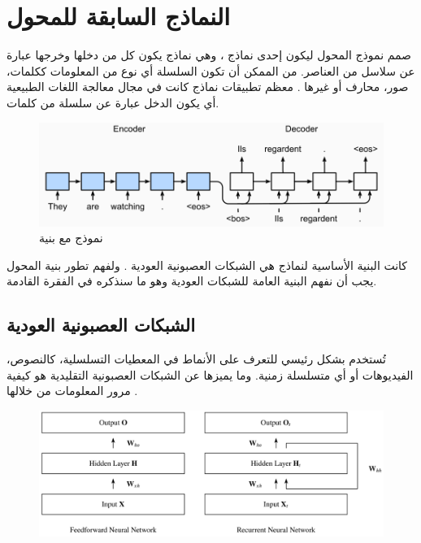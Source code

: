 \section{النماذج السابقة للمحول}
صمم نموذج المحول
ليكون إحدى نماذج
،
وهي نماذج يكون كل من دخلها وخرجها عبارة عن سلاسل من العناصر. من الممكن أن تكون السلسلة أي نوع من المعلومات ككلمات، صور، محارف أو غيرها
.
\newline
معظم تطبيقات نماذج
 كانت في مجال معالجة اللغات الطبيعية
 أي يكون الدخل عبارة عن سلسلة من كلمات.
\begin{figure}[h!]
\centerline{
	\includegraphics[width=\textwidth]{images/RNN.png}}
\caption{نموذج
مع بنية
}
\label{fig:RNN1}	
\end{figure}
كانت البنية الأساسية لنماذج
هي الشبكات العصبونية العودية
.
ولفهم تطور بنية المحول يجب أن نفهم البنية العامة للشبكات العودية وهو ما سنذكره في الفقرة القادمة.
\newline
\subsection{الشبكات العصبونية العودية
}
تُستخدم
 بشكل رئيسي للتعرف على الأنماط في المعطيات التسلسلية، كالنصوص، الفيديوهات أو أي متسلسلة زمنية. وما يميزها
 عن الشبكات العصبونية التقليدية
 هو كيفية مرور المعلومات من خلالها
.

\begin{figure}[H]
	\centerline{\includegraphics[width=\textwidth]{images/RNN_gentle_introduction.png}}
	\caption{}
	\label{fig:RNN2}
\end{figure}
\vspace{-8.0mm}
\centerline{}

